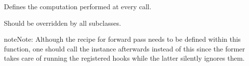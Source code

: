 \documentclass[letterpaper,10pt,english]{sphinxmanual}
\begin{document}
\begin{fulllineitems}
\begin{savenotes}\sphinxattablestart
\centering
\begin{tabulary}{\linewidth}[t]{|T|T|}
\hline

&\\
\hline
\end{tabulary}
\par
\sphinxattableend\end{savenotes}

\begin{fulllineitems}
\label{\detokenize{index:pathflowai.losses.FocalLoss.forward}}
Defines the computation performed at every call.

Should be overridden by all subclasses.

\begin{sphinxadmonition}{note}{Note:}
Although the recipe for forward pass needs to be defined within
this function, one should call the  instance afterwards
instead of this since the former takes care of running the
registered hooks while the latter silently ignores them.
\end{sphinxadmonition}

\end{fulllineitems}


\end{fulllineitems}

\end{document}
